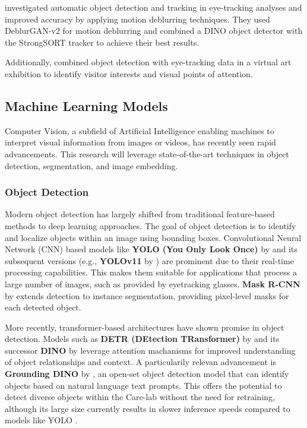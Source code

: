 \documentclass[english]{hogent-article}
\begin{document}
\textcite{Cederin2023} investigated automatic object detection and tracking in eye-tracking analyses and improved accuracy by applying motion deblurring techniques. 
They used DeblurGAN-v2 for motion deblurring and combined a DINO object detector with the StrongSORT tracker to achieve their best results.

Additionally, \textcite{Kulyk2023} combined object detection with eye-tracking data in a virtual art exhibition to identify visitor interests and visual points of attention.

\subsection{Machine Learning Models}

Computer Vision, a subfield of Artificial Intelligence enabling machines to interpret visual information from images or videos, has recently seen rapid advancements. 
This research will leverage state-of-the-art techniques in object detection, segmentation, and image embedding.

\subsubsection{Object Detection}

Modern object detection has largely shifted from traditional feature-based methods to deep learning approaches.
The goal of object detection is to identify and localize objects within an image using bounding boxes.
Convolutional Neural Network (CNN) based models like \textbf{YOLO (You Only Look Once)} by \textcite{Redmon2016} and 
its subsequent versions (e.g., \textbf{YOLOv11} by \textcite{Khanam2024}) are prominent due to their real-time processing capabilities.
This makes them suitable for applications that process a large number of images, such as provided by eyetracking glasses.
\textbf{Mask R-CNN} by \textcite{He2018} extends detection to instance segmentation, providing pixel-level masks for each detected object.

More recently, transformer-based architectures have shown promise in object detection. 
Models such as \textbf{DETR (DEtection TRansformer)} by \textcite{Carion2020} and its successor \textbf{DINO} by \textcite{Zhang2022} 
leverage attention machanisms for improved understanding of object relationships and context.
A particularily relevan advancement is \textbf{Grounding DINO} by \textcite{Liu2023}, an open-set object detection model that can identify objects based on natural language text prompts.
This offers the potential to detect diverse objects within the Care-lab without the need for retraining, although its large size currently results in slower inference speeds compared to models like YOLO \autocite{Son2024}.
\end{document}
